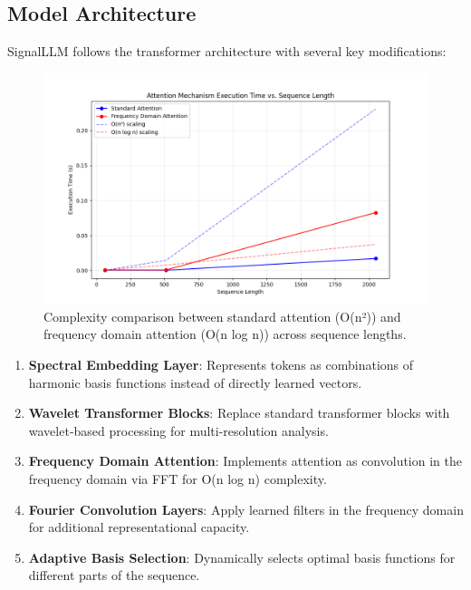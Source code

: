 \documentclass[10pt,twocolumn,letterpaper]{article}
\begin{document}
\subsection{Model Architecture}

SignalLLM follows the transformer architecture with several key modifications:

\begin{figure}[t]
    \centering
    \includegraphics[width=0.9\linewidth]{report_assets/complexity_comparison.png}
    \caption{Complexity comparison between standard attention (O(n²)) and frequency domain attention (O(n log n)) across sequence lengths.}
    \label{fig:complexity}
\end{figure}

\begin{enumerate}
    \item \textbf{Spectral Embedding Layer}: Represents tokens as combinations of harmonic basis functions instead of directly learned vectors.
    
    \item \textbf{Wavelet Transformer Blocks}: Replace standard transformer blocks with wavelet-based processing for multi-resolution analysis.
    
    \item \textbf{Frequency Domain Attention}: Implements attention as convolution in the frequency domain via FFT for O(n log n) complexity.
    
    \item \textbf{Fourier Convolution Layers}: Apply learned filters in the frequency domain for additional representational capacity.
    
    \item \textbf{Adaptive Basis Selection}: Dynamically selects optimal basis functions for different parts of the sequence.
\end{enumerate}
\end{document}
